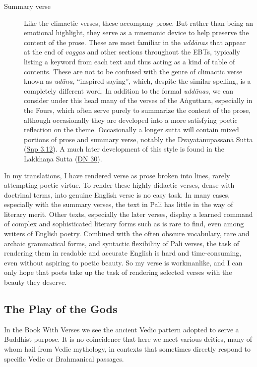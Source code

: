\documentclass[12pt,openany]{book}%
\begin{document}
\begin{description}
\item[Summary verse] Like the climactic verses, these accompany prose. But rather than being an emotional highlight, they serve as a mnemonic device to help preserve the content of the prose. These are most familiar in the \textit{\textsanskrit{uddānas}} that appear at the end of \textit{vaggas} and other sections throughout the EBTs, typically listing a keyword from each text and thus acting as a kind of table of contents. These are not to be confused with the genre of climactic verse known as \textit{\textsanskrit{udāna}}, “inspired saying”, which, despite the similar spelling, is a completely different word. In addition to the formal \textit{\textsanskrit{uddānas}}, we can consider under this head many of the verses of the \textsanskrit{Aṅguttara}, especially in the Fours, which often serve purely to summarize the content of the prose, although occasionally they are developed into a more satisfying poetic reflection on the theme. Occasionally a longer sutta will contain mixed portions of prose and summary verse, notably the \textsanskrit{Dvayatānupassanā} Sutta (\href{https://suttacentral.net/snp3.12}{Snp 3.12}). A much later development of this style is found in the \textsanskrit{Lakkhaṇa} Sutta (\href{https://suttacentral.net/dn30}{DN 30}).%
\end{description}

In my translations, I have rendered verse as prose broken into lines, rarely attempting poetic virtue. To render these highly didactic verses, dense with doctrinal terms, into genuine English verse is no easy task. In many cases, especially with the summary verses, the text in Pali has little in the way of literary merit. Other texts, especially the later verses, display a learned command of complex and sophisticated literary forms such as is rare to find, even among writers of English poetry. Combined with the often obscure vocabulary, rare and archaic grammatical forms, and syntactic flexibility of Pali verses, the task of rendering them in readable and accurate English is hard and time-consuming, even without aspiring to poetic beauty. So my verse is workmanlike, and I can only hope that poets take up the task of rendering selected verses with the beauty they deserve.

\subsection*{The Play of the Gods}

In the Book With Verses we see the ancient Vedic pattern adopted to serve a Buddhist purpose. It is no coincidence that here we meet various deities, many of whom hail from Vedic mythology, in contexts that sometimes directly respond to specific Vedic or Brahmanical passages.
\end{document}
